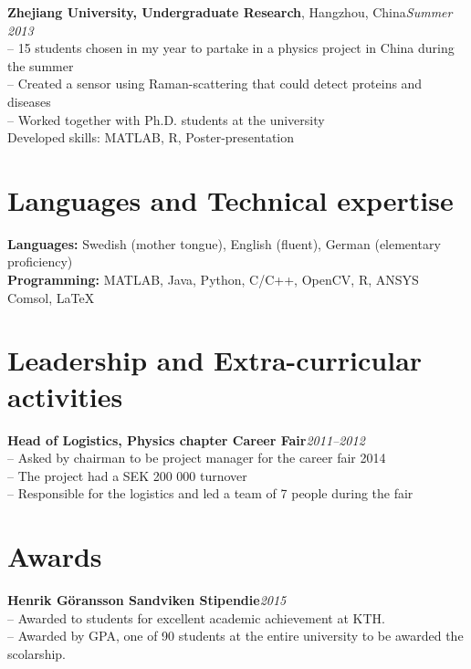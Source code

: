 \documentclass[10pt]{article}
\begin{document}
\noindent\textbf{Zhejiang University, Undergraduate Research}, Hangzhou, China\hfill\textit{Summer 2013}\\
\indent-- 15 students chosen in my year to partake in a physics project in China during the summer\\
\indent-- Created a sensor using Raman-scattering that could detect proteins and diseases\\
\indent-- Worked together with Ph.D. students at the university\\
\indent Developed skills: MATLAB, R, Poster-presentation\\

\section*{Languages and Technical expertise}
\vspace{0.2em}
\hline
\vspace{0.5em}
\noindent\textbf{Languages:} Swedish (mother tongue), English (fluent), German (elementary proficiency)\\
\textbf{Programming:} MATLAB, Java, Python, C{/}C++, OpenCV, R, ANSYS Comsol, \LaTeX\\

\section*{Leadership and Extra-curricular activities}
\vspace{0.1em}
\hline
\vspace{0.3em}

\noindent\textbf{Head of Logistics, Physics chapter Career Fair}\hfill\textit{2011--2012} \\
\indent-- Asked by chairman to be project manager for the career fair 2014\\
\indent-- The project had a SEK 200 000 turnover\\
\indent-- Responsible for the logistics and led a team of 7 people during the fair\\

\section*{Awards}
\vspace{0.2em}
\hline
\vspace{0.5em}
\noindent\textbf{Henrik Göransson Sandviken Stipendie}\hfill\textit{2015}\\
\indent-- Awarded to students for excellent academic achievement at KTH.\\
\indent-- Awarded by GPA, one of 90 students at the entire university to be awarded the scolarship.\\
\end{document}
